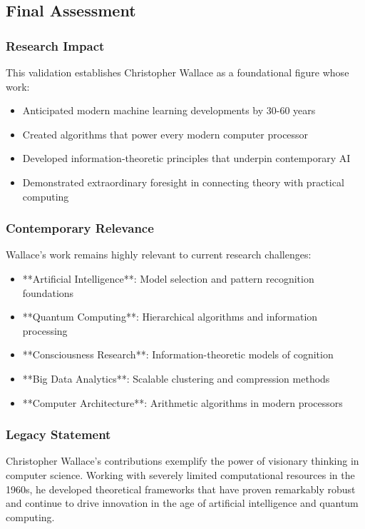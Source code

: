 \subsection{Final Assessment}

\subsubsection{Research Impact}

This validation establishes Christopher Wallace as a foundational figure whose work:
\begin{itemize}
    \item Anticipated modern machine learning developments by 30-60 years
    \item Created algorithms that power every modern computer processor
    \item Developed information-theoretic principles that underpin contemporary AI
    \item Demonstrated extraordinary foresight in connecting theory with practical computing
\end{itemize}

\subsubsection{Contemporary Relevance}

Wallace's work remains highly relevant to current research challenges:
\begin{itemize}
    \item **Artificial Intelligence**: Model selection and pattern recognition foundations
    \item **Quantum Computing**: Hierarchical algorithms and information processing
    \item **Consciousness Research**: Information-theoretic models of cognition
    \item **Big Data Analytics**: Scalable clustering and compression methods
    \item **Computer Architecture**: Arithmetic algorithms in modern processors
\end{itemize}

\subsubsection{Legacy Statement}

Christopher Wallace's contributions exemplify the power of visionary thinking in computer science. Working with severely limited computational resources in the 1960s, he developed theoretical frameworks that have proven remarkably robust and continue to drive innovation in the age of artificial intelligence and quantum computing.

